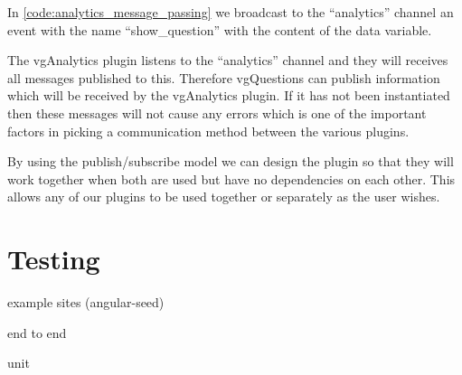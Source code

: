 In \autoref{code:analytics_message_passing} we broadcast to the ``analytics'' channel an event with the name
``show\_question'' with the content of the data variable.

The vgAnalytics plugin listens to the ``analytics'' channel and they will receives all messages published to this. Therefore vgQuestions can publish information which will be received by the vgAnalytics plugin. If it has not
been instantiated then these messages will not cause any errors which is one of the important factors in picking a communication method between the various plugins.

By using the publish/subscribe model we can design the plugin so that they will work together when both are used but have no dependencies on each other. This allows any of our plugins to be used together or separately as the
user wishes.

\section{Testing}
\label{Section:Testing}

example sites (angular-seed)

end to end

unit

